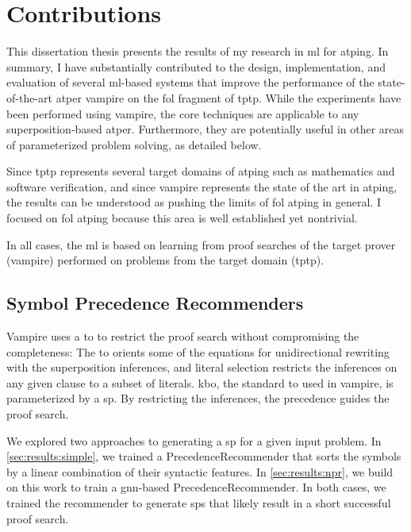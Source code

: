 
\section{Contributions}

This dissertation thesis presents the results of my research in \gls{ml} for \gls{atping}.
In summary, I have substantially contributed to the design, implementation, and evaluation of several \acrshort{ml}-based systems that improve the performance of the state-of-the-art \gls{atper} \gls{vampire} on the \gls{fol} fragment of \gls{tptp}.
While the experiments have been performed using \gls{vampire},
the core techniques are applicable to any \gls{superposition}-based \gls{atper}.
Furthermore, they are potentially useful in other areas of parameterized problem solving, as detailed below.

Since \gls{tptp} represents several target domains of \gls{atping}
such as mathematics and software verification,
and since \gls{vampire} represents the state of the art in \gls{atping},
the results can be understood as pushing the limits of \gls{fol} \gls{atping} in general.
I focused on \gls{fol} \gls{atping} because this area is well established yet nontrivial.

In all cases, the \gls{ml} is based on learning from proof searches of the target prover (\gls{vampire}) performed on problems from the target domain (\gls{tptp}).

\subsection{Symbol Precedence Recommenders}
\label{sec:contrib:SymbolPrecedenceRecommenders}

Vampire uses a \gls{to} to restrict the proof search without compromising the completeness:
The \gls{to} orients some of the equations for unidirectional rewriting with the superposition inferences,
and literal selection restricts the inferences on any given clause to a subset of literals.
\Gls{kbo}, the standard \gls{to} used in \gls{vampire}, is parameterized by a \gls{sp}.
By restricting the inferences, the precedence guides the proof search.

We explored two approaches to generating a \gls{sp} for a given input problem.
In \cref{sec:results:simple}, we trained a \gls{PrecedenceRecommender} that sorts the symbols by a linear combination of their syntactic features.
In \cref{sec:results:npr}, we build on this work to train a \acrshort{gnn}-based \gls{PrecedenceRecommender}.
In both cases, we trained the recommender to generate \glspl{sp} that likely result in a short successful proof search.


